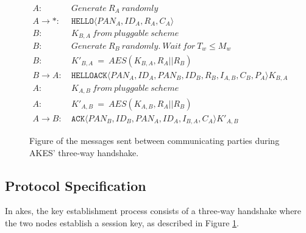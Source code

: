 \begin{figure}[h]
\begin{tcolorbox}[title=Three-way handshake in AKES]
\begin{align*}
A:\ & Generate\ R_A\ randomly\\
A \rightarrow *:\ & \texttt{HELLO}\langle{PAN_A, ID_A, R_A, C_A}\rangle{}\\
B:\ & K_{B,A}\ from\ pluggable\ scheme\\
B:\ & Generate\ R_B\ randomly.\ Wait\ for\ T_w \leq M_w\\
B:\ & K'_{B,A}\ =\ AES(K_{B,A}, R_A || R_B)\\
B \rightarrow A:\ & \texttt{HELLOACK}\langle{PAN_A, ID_A, PAN_B, ID_B, R_B, I_{A,B}, C_B, P_A}\rangle{K_{B,A}}\\
A:\ & K_{A,B}\ from\ pluggable\ scheme\\
A:\ & K'_{A,B}\ =\ AES(K_{A,B}, R_A || R_B)\\
A \rightarrow B:\ & \texttt{ACK}\langle{PAN_B, ID_B, PAN_A, ID_A, I_{B,A}, C_A}\rangle{K'_{A,B}}
\end{align*}
\end{tcolorbox}
\caption{Figure of the messages sent between communicating parties during AKES' three-way handshake.}
\label{fig:akes-handshake}
\end{figure}

\subsection{Protocol Specification}
\label{subsec:akes-specs}

In \gls{akes}, the key establishment process consists of a three-way handshake where the two nodes establish a session key, as described in Figure \ref{fig:akes-handshake}.

